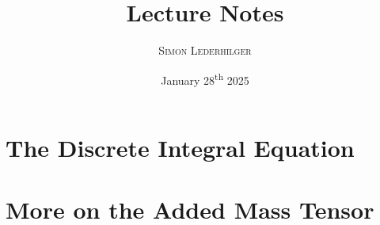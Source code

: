 \documentclass{article}
\title{Lecture Notes}
\subtitle{\textit{\headcourse}}
\author{\textsc{Simon Lederhilger}}
\date{January 28\textsuperscript{th} 2025}
\begin{document}
\maketitle\thispagestyle{fancy}
\begin{multicols*}{2}
    \section[Discrete Integral Eq.]{The Discrete Integral Equation}
    

    \section[Added Mass]{More on the Added Mass Tensor}
    

    \printbibliography
\end{multicols*}
\end{document}
